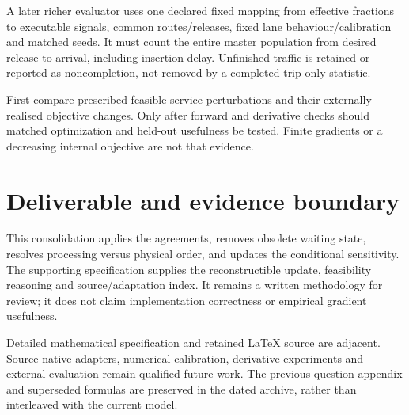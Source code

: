 \documentclass[11pt,a4paper]{article}
\begin{document}
A later richer evaluator uses one declared fixed mapping from effective
fractions to executable signals, common routes/releases, fixed lane
behaviour/calibration and matched seeds. It must count the entire master
population from desired release to arrival, including insertion delay.
Unfinished traffic is retained or reported as noncompletion, not removed
by a completed-trip-only statistic.

First compare prescribed feasible service perturbations and their
externally realised objective changes. Only after forward and derivative
checks should matched optimization and held-out usefulness be tested.
Finite gradients or a decreasing internal objective are not that evidence.

\section{Deliverable and evidence boundary}

This consolidation applies the agreements, removes obsolete waiting
state, resolves processing versus physical order, and updates the
conditional sensitivity. The supporting specification supplies the
reconstructible update, feasibility reasoning and source/adaptation
index. It remains a written methodology for review; it does not claim
implementation correctness or empirical gradient usefulness.

\href{urban_methodology_specification.pdf}{Detailed mathematical specification}
and \href{urban_methodology_specification.tex}{retained LaTeX source}
are adjacent. Source-native adapters, numerical calibration, derivative
experiments and external evaluation remain qualified future work.
The previous question appendix and superseded formulas are preserved
in the dated archive, rather than interleaved with the current model.
\end{document}
